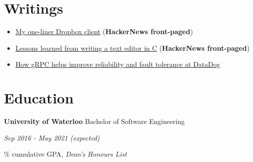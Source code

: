 \documentclass[paper=a4,fontsize=15pt]{scrartcl}
\newcommand{\quarterspace}{\vspace*{0.25em}}
\begin{document}
\section*{Writings}{}
\begin{itemize}[noitemsep,leftmargin=20pt,label=\raisebox{0.25ex}{\tiny$\bullet$},topsep=5pt]
  \small
  \item \href{http://lpan.io/one-liner-dropbox-client}{\ul{My one-liner Dropbox
        client}} (\textbf{HackerNews front-paged})
  \item \href{http://lpan.io/what-i-learnt-from-viw}{\ul{Lessons learned from
        writing a text editor in C}} (\textbf{HackerNews front-paged})
  \item \href{http://lpan.io/migrating-to-grpc}{\ul{How gRPC helps improve
        reliability and fault tolerance at DataDog}}
\end{itemize}

\section*{Education}{}
\noindent \textbf{University of Waterloo} Bachelor of Software Engineering \par
\quarterspace
\footnotesize
\noindent \textit{Sep 2016 - May 2021 (expected)} \par
{}\% cumulative GPA, \textit{Dean's Honours List}
\end{document}
